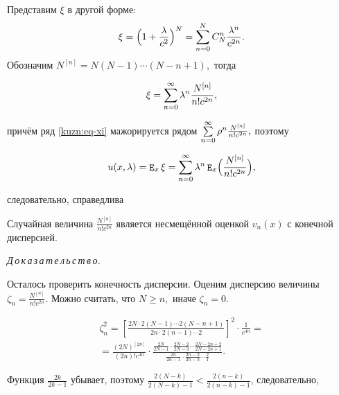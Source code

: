     Представим $\xi$ в другой форме: $$\xi=\Bigl(1+\frac{\lambda}{c^2}\Bigr)^N=\sum\limits_{n=0}^N C_N^n\frac{\lambda^n}{c^{2n}}.$$ Обозначим $N^{[n]}=N(N-1)\cdots(N-n+1),$ тогда

    \begin{equation}\label{kuzn:eq-xi}

        \xi=\lsum_{n=0}^\infty\lambda^n\frac{N^{[n]}}{n!c^{2n}},

    \end{equation}

    причём ряд \eqref{kuzn:eq-xi} мажорируется рядом $\sum\limits_{n=0}^\infty\rho^n\frac{N^{[n]}}{n!c^{2n}},$ поэтому

    \[

        u(x, \lambda)=\expect_x\xi=\lsum_{n=0}^\infty\lambda^n\expect_x\Bigl(\frac{N^{[n]}}{n!c^{2n}}\Bigr),

    \]

    следовательно, справедлива

    \begin{theorem}{}

        Случайная величина $\frac{N^{[n]}}{n!c^{2n}}$ является несмещённой оценкой $v_n(x)$ с конечной дисперсией.

    \end{theorem}



\smallskip

{\it Д\,о\,к\,а\,з\,а\,т\,е\,л\,ь\,с\,т\,в\,о.}

        Осталось проверить конечность дисперсии. Оценим дисперсию величины ${\zeta_n=\frac{N^{[n]}}{n!c^{2n}}}$. Можно считать, что $N\geqslant n,$ иначе ${\zeta_n=0}$.

\begin{multline*}

            \zeta_n^2=\left[\frac{2N\cdot 2(N-1) \cdots 2(N-n+1)}{2n\cdot2(n-1) \cdots 2}\right]^2\cdot\frac{1}{c^{4n}}=

\\            

         =   \frac{(2N)^{[2n]}}{(2n)!c^{4n}}\cdot\frac{\frac{2N}{2N-1}\cdot\frac{2N-2}{2N-3} \cdots \frac{2N-2n+2}{2N-2n+1}}{\frac{2n}{2n-1}\cdot\frac{2n-2}{2n-3} \cdots \frac{2}{1}}.

\end{multline*}



        Функция $\frac{2k}{2k-1}$ убывает, поэтому $\frac{2(N-k)}{2(N-k)-1}<\frac{2(n-k)}{2(n-k)-1}$, следовательно,

